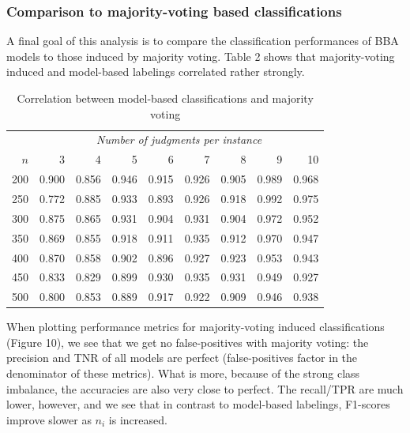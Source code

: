 \documentclass[12pt,]{article}
\begin{document}
\hypertarget{comparison-to-majority-voting-based-classifications}{%
\subsubsection{Comparison to majority-voting based
classifications}\label{comparison-to-majority-voting-based-classifications}}

A final goal of this analysis is to compare the classification
performances of BBA models to those induced by majority voting. Table 2
shows that majority-voting induced and model-based labelings correlated
rather strongly.

\begin{table}[!h]

\caption{\label{tab:tab class corr}Correlation between model-based classifications and majority voting}
\centering
\begin{tabular}{rrrrrrrrr}
\toprule
\multicolumn{1}{c}{\em  } & \multicolumn{8}{c}{\em Number of judgments per instance} \\
\cmidrule(l{2pt}r{2pt}){2-9}
$n$ & 3 & 4 & 5 & 6 & 7 & 8 & 9 & 10\\
\midrule
200 & 0.900 & 0.856 & 0.946 & 0.915 & 0.926 & 0.905 & 0.989 & 0.968\\
250 & 0.772 & 0.885 & 0.933 & 0.893 & 0.926 & 0.918 & 0.992 & 0.975\\
300 & 0.875 & 0.865 & 0.931 & 0.904 & 0.931 & 0.904 & 0.972 & 0.952\\
350 & 0.869 & 0.855 & 0.918 & 0.911 & 0.935 & 0.912 & 0.970 & 0.947\\
400 & 0.870 & 0.858 & 0.902 & 0.896 & 0.927 & 0.923 & 0.953 & 0.943\\
450 & 0.833 & 0.829 & 0.899 & 0.930 & 0.935 & 0.931 & 0.949 & 0.927\\
500 & 0.800 & 0.853 & 0.889 & 0.917 & 0.922 & 0.909 & 0.946 & 0.938\\
\bottomrule
\end{tabular}
\end{table}

When plotting performance metrics for majority-voting induced
classifications (Figure 10), we see that we get no false-positives with
majority voting: the precision and TNR of all models are perfect
(false-positives factor in the denominator of these metrics). What is
more, because of the strong class imbalance, the accuracies are also
very close to perfect. The recall/TPR are much lower, however, and we
see that in contrast to model-based labelings, F1-scores improve slower
as \(n_i\) is increased.
\end{document}
